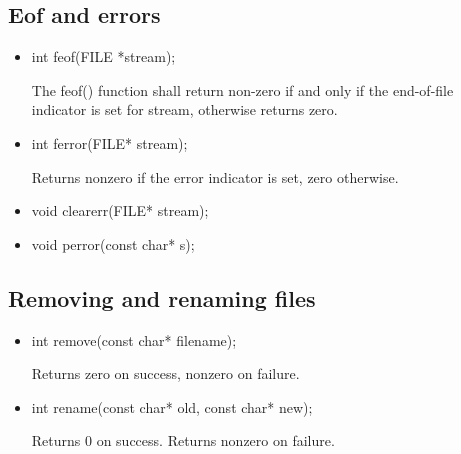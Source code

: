 \documentclass{report}
\begin{document}
    \pagebreak 
    \subsection{Eof and errors}
    \begin{itemize}
        \item 
            \bigbreak \noindent 
            \begin{cppcode}
               int feof(FILE *stream);
            \end{cppcode}
            \bigbreak \noindent 
            The feof() function shall return non-zero if and only if the end-of-file indicator is set for stream, otherwise returns zero.
        \item 
            \bigbreak \noindent 
            \begin{cppcode}
                int ferror(FILE* stream);
            \end{cppcode}
            \bigbreak \noindent 
            Returns nonzero if the error indicator is set, zero otherwise.
        \item 
            \bigbreak \noindent 
            \begin{cppcode}
                void clearerr(FILE* stream);
            \end{cppcode}
        \item 
            \bigbreak \noindent 
            \begin{cppcode}
                void perror(const char* s);
            \end{cppcode}

    \end{itemize}

    \pagebreak 
    \subsection{Removing and renaming files}
    \begin{itemize}
        \item
            \bigbreak \noindent 
            \begin{cppcode}
            int remove(const char* filename);
            \end{cppcode}
            \bigbreak \noindent
            Returns zero on success, nonzero on failure.
        \item 
            \bigbreak \noindent 
            \begin{cppcode}
            int rename(const char* old, const char* new);
            \end{cppcode}
            \bigbreak \noindent 
            Returns 0 on success. Returns nonzero on failure.

    \end{itemize}
\end{document}
